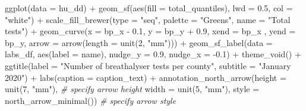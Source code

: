 \documentclass[
]{book}
\makeatletter
\newenvironment{Shaded}{\begin{snugshade}}{\end{snugshade}}
\newcommand{\AttributeTok}[1]{\textcolor[rgb]{0.61,0.61,0.61}{#1}}
\newcommand{\CommentTok}[1]{\textcolor[rgb]{0.37,0.37,0.37}{\textit{#1}}}
\newcommand{\DecValTok}[1]{\textcolor[rgb]{0.06,0.06,0.06}{#1}}
\newcommand{\FloatTok}[1]{\textcolor[rgb]{0.06,0.06,0.06}{#1}}
\newcommand{\FunctionTok}[1]{\textcolor[rgb]{0,0,0}{#1}}
\newcommand{\NormalTok}[1]{#1}
\newcommand{\SpecialCharTok}[1]{\textcolor[rgb]{0,0,0}{#1}}
\newcommand{\StringTok}[1]{\textcolor[rgb]{0.5,0.5,0.5}{#1}}
\newenvironment{kframe}{%
\medskip{}
\setlength{\fboxsep}{.8em}
 \def\at@end@of@kframe{}%
 \ifinner\ifhmode%
  \def\at@end@of@kframe{\end{minipage}}%
  \begin{minipage}{\columnwidth}%
 \fi\fi%
 \def\FrameCommand##1{\hskip\@totalleftmargin \hskip-\fboxsep
 \colorbox{shadecolor}{##1}\hskip-\fboxsep
     \hskip-\linewidth \hskip-\@totalleftmargin \hskip\columnwidth}%
 \MakeFramed {\advance\hsize-\width
   \@totalleftmargin\z@ \linewidth\hsize
   \@setminipage}}%
 {\par\unskip\endMakeFramed%
 \at@end@of@kframe}
\renewenvironment{Shaded}{\begin{kframe}}{\end{kframe}}
\makeatother
\begin{document}
\begin{Shaded}
\begin{Highlighting}[]
\FunctionTok{ggplot}\NormalTok{(}\AttributeTok{data =}\NormalTok{ hu\_dd) }\SpecialCharTok{+} 
  \FunctionTok{geom\_sf}\NormalTok{(}\FunctionTok{aes}\NormalTok{(}\AttributeTok{fill =}\NormalTok{ total\_quantiles), }
          \AttributeTok{lwd =} \FloatTok{0.5}\NormalTok{, }\AttributeTok{col =} \StringTok{"white"}\NormalTok{) }\SpecialCharTok{+} 
  \FunctionTok{scale\_fill\_brewer}\NormalTok{(}\AttributeTok{type =} \StringTok{"seq"}\NormalTok{, }
                    \AttributeTok{palette =} \StringTok{"Greens"}\NormalTok{, }
                    \AttributeTok{name =} \StringTok{"Total tests"}\NormalTok{) }\SpecialCharTok{+} 
  \FunctionTok{geom\_curve}\NormalTok{(}\AttributeTok{x =}\NormalTok{ bp\_x }\SpecialCharTok{{-}} \FloatTok{0.1}\NormalTok{, }
             \AttributeTok{y =}\NormalTok{ bp\_y }\SpecialCharTok{+} \FloatTok{0.9}\NormalTok{, }
             \AttributeTok{xend =}\NormalTok{ bp\_x , }
             \AttributeTok{yend =}\NormalTok{ bp\_y, }
             \AttributeTok{arrow =} \FunctionTok{arrow}\NormalTok{(}\AttributeTok{length =} \FunctionTok{unit}\NormalTok{(}\DecValTok{2}\NormalTok{, }\StringTok{"mm"}\NormalTok{))) }\SpecialCharTok{+}
  \FunctionTok{geom\_sf\_label}\NormalTok{(}\AttributeTok{data =}\NormalTok{ labs\_df, }
                \FunctionTok{aes}\NormalTok{(}\AttributeTok{label =}\NormalTok{ name), }
                \AttributeTok{nudge\_y =} \FloatTok{0.9}\NormalTok{, }
                \AttributeTok{nudge\_x =} \SpecialCharTok{{-}}\FloatTok{0.1}\NormalTok{) }\SpecialCharTok{+} 
  \FunctionTok{theme\_void}\NormalTok{() }\SpecialCharTok{+} 
  \FunctionTok{ggtitle}\NormalTok{(}\AttributeTok{label =} \StringTok{"Number of breathalyser tests per county"}\NormalTok{, }
          \AttributeTok{subtitle =} \StringTok{"January 2020"}\NormalTok{) }\SpecialCharTok{+} 
  \FunctionTok{labs}\NormalTok{(}\AttributeTok{caption =}\NormalTok{ caption\_text) }\SpecialCharTok{+} 
  \FunctionTok{annotation\_north\_arrow}\NormalTok{(}\AttributeTok{height =} \FunctionTok{unit}\NormalTok{(}\DecValTok{7}\NormalTok{, }\StringTok{"mm"}\NormalTok{), }\CommentTok{\# specify arrow height}
                         \AttributeTok{width =} \FunctionTok{unit}\NormalTok{(}\DecValTok{5}\NormalTok{, }\StringTok{"mm"}\NormalTok{), }
                        \AttributeTok{style =} \FunctionTok{north\_arrow\_minimal}\NormalTok{()) }\CommentTok{\# specify arrow style}
\end{Highlighting}
\end{Shaded}
\end{document}
